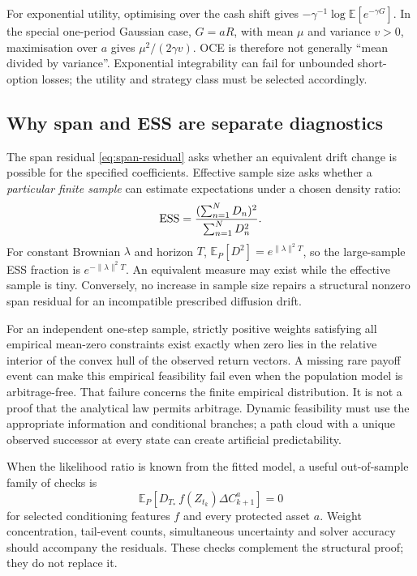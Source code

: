\documentclass[11pt,a4paper]{article}
\numberwithin{equation}{section}
\theoremstyle{definition}\newtheorem{definition}[theorem]{Definition}
\theoremstyle{remark}\newtheorem{remark}[theorem]{Remark}
\newcommand{\E}{\mathbb E}\newcommand{\R}{\mathbb R}
\begin{document}
For exponential utility, optimising over the cash shift gives $-\gamma^{-1}\log\E[e^{-\gamma G}]$. In the special one-period Gaussian case, $G=aR$, with mean $\mu$ and variance $v>0$, maximisation over $a$ gives $\mu^2/(2\gamma v)$. OCE is therefore not generally ``mean divided by variance''. Exponential integrability can fail for unbounded short-option losses; the utility and strategy class must be selected accordingly.

\subsection{Why span and ESS are separate diagnostics}
The span residual \eqref{eq:span-residual} asks whether an equivalent drift change is possible for the specified coefficients. Effective sample size asks whether a \emph{particular finite sample} can estimate expectations under a chosen density ratio:
\begin{equation}
 \operatorname{ESS}=\frac{(\sum_{n=1}^ND_n)^2}{\sum_{n=1}^ND_n^2}.
 \label{eq:ess}
\end{equation}
For constant Brownian $\lambda$ and horizon $T$, $\E_P[D^2]=e^{\|\lambda\|^2T}$, so the large-sample ESS fraction is $e^{-\|\lambda\|^2T}$. An equivalent measure may exist while the effective sample is tiny. Conversely, no increase in sample size repairs a structural nonzero span residual for an incompatible prescribed diffusion drift.

For an independent one-step sample, strictly positive weights satisfying all empirical mean-zero constraints exist exactly when zero lies in the relative interior of the convex hull of the observed return vectors. A missing rare payoff event can make this empirical feasibility fail even when the population model is arbitrage-free. That failure concerns the finite empirical distribution. It is not a proof that the analytical law permits arbitrage. Dynamic feasibility must use the appropriate information and conditional branches; a path cloud with a unique observed successor at every state can create artificial predictability.

When the likelihood ratio is known from the fitted model, a useful out-of-sample family of checks is
\begin{equation}
 \E_P\left[D_{T_*}\,f(Z_{t_k})\Delta C^a_{k+1}\right]=0
 \label{eq:weighted-moments}
\end{equation}
for selected conditioning features $f$ and every protected asset $a$. Weight concentration, tail-event counts, simultaneous uncertainty and solver accuracy should accompany the residuals. These checks complement the structural proof; they do not replace it.
\end{document}
